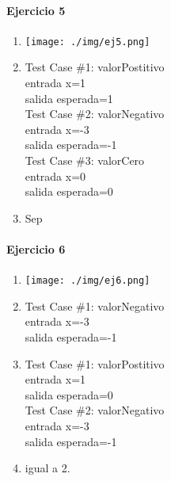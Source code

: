 \documentclass{article}
\begin{document}
\paragraph{Ejercicio 5}

\begin{multicols}{2}
\begin{enumerate}
\item \texttt{[image: ./img/ej5.png]}
\item 
Test Case \#1: valorPostitivo\\
\hspace*{6mm}entrada x=1\\
\hspace*{6mm}salida esperada=1\medskip\\
Test Case \#2: valorNegativo\\
\hspace*{6mm}entrada x=-3\\
\hspace*{6mm}salida esperada=-1\medskip\\
Test Case \#3: valorCero\\
\hspace*{6mm}entrada x=0\\
\hspace*{6mm}salida esperada=0\medskip\\
\item	Sep
\end{enumerate}
\end{multicols}

\paragraph{Ejercicio 6}

\begin{multicols}{2}
\begin{enumerate}
\item \texttt{[image: ./img/ej6.png]}
\item 
Test Case \#1: valorNegativo\\
\hspace*{6mm}entrada x=-3\\
\hspace*{6mm}salida esperada=-1\medskip\\

\item	
Test Case \#1: valorPostitivo\\
\hspace*{6mm}entrada x=1\\
\hspace*{6mm}salida esperada=0\medskip\\
Test Case \#2: valorNegativo\\
\hspace*{6mm}entrada x=-3\\
\hspace*{6mm}salida esperada=-1\medskip\\
\item igual a 2.
\end{enumerate}

\end{multicols}
\end{document}
